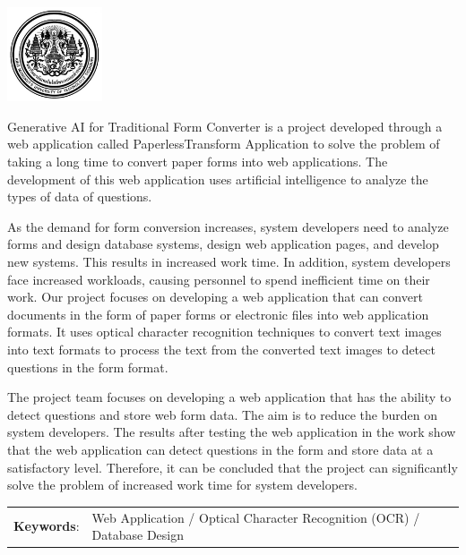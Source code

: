 \documentclass[12pt,oneside,openright,a4paper]{cpe-english-project}
\begin{document}
\pdfstringdefDisableCommands{%
\let\MakeUppercase\relax
}
\begin{center}
  \includegraphics[width=2.8cm]{logo02.jpg}
\end{center}
\vspace*{-1cm}

\maketitlepage
\makesignaturepage 

\abstract

\setlength{\parindent}{15pt} Generative AI for Traditional Form Converter is a project developed through a web application called PaperlessTransform Application
to solve the problem of taking a long time to convert paper forms into web applications. The development of this web application uses artificial intelligence to analyze the types of data of questions.\par
As the demand for form conversion increases, system developers need to analyze forms and design database systems, design web application pages, and develop new systems.
This results in increased work time. In addition, system developers face increased workloads, causing personnel to spend inefficient time on their work.
Our project focuses on developing a web application that can convert documents in the form of paper forms or electronic files into web application formats.
It uses optical character recognition techniques to convert text images into text formats to process the text from the converted text images to detect questions in the form format.\par
The project team focuses on developing a web application that has the ability to detect questions and store web form data.
The aim is to reduce the burden on system developers. The results after testing the web application in the work show that the web application can detect questions in the form and store data at a satisfactory level. Therefore, it can be concluded that the project can significantly solve the problem of increased work time for system developers.

\begin{flushleft}
\begin{tabular*}{\textwidth}{@{}lp{}}
\textbf{Keywords}: & Web Application / Optical Character Recognition (OCR) / Database Design

\end{tabular*}
\end{flushleft}
\endabstract
\end{document}
